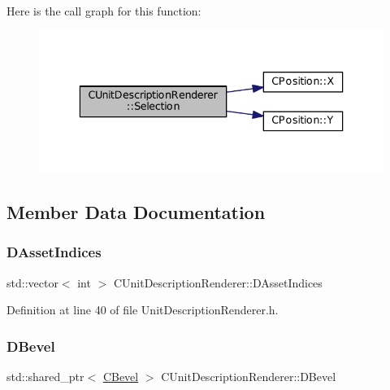 Here is the call graph for this function\+:\nopagebreak
\begin{figure}[H]
\begin{center}
\leavevmode
\includegraphics[width=336pt]{classCUnitDescriptionRenderer_a6ef0c9f010b5502def622e6d830795c7_cgraph}
\end{center}
\end{figure}


\subsection{Member Data Documentation}
\hypertarget{classCUnitDescriptionRenderer_a3d311375ab23745786d20076842e3099}{}\label{classCUnitDescriptionRenderer_a3d311375ab23745786d20076842e3099} 
\subsubsection{\texorpdfstring{D\+Asset\+Indices}{DAssetIndices}}
{\footnotesize\ttfamily std\+::vector$<$ int $>$ C\+Unit\+Description\+Renderer\+::\+D\+Asset\+Indices\hspace{0.3cm}{\ttfamily [protected]}}



Definition at line 40 of file Unit\+Description\+Renderer.\+h.

\hypertarget{classCUnitDescriptionRenderer_a9f4cd9f9d8dbc5036c885980494db41e}{}\label{classCUnitDescriptionRenderer_a9f4cd9f9d8dbc5036c885980494db41e} 
\subsubsection{\texorpdfstring{D\+Bevel}{DBevel}}
{\footnotesize\ttfamily std\+::shared\+\_\+ptr$<$ \hyperlink{classCBevel}{C\+Bevel} $>$ C\+Unit\+Description\+Renderer\+::\+D\+Bevel\hspace{0.3cm}{\ttfamily [protected]}}



